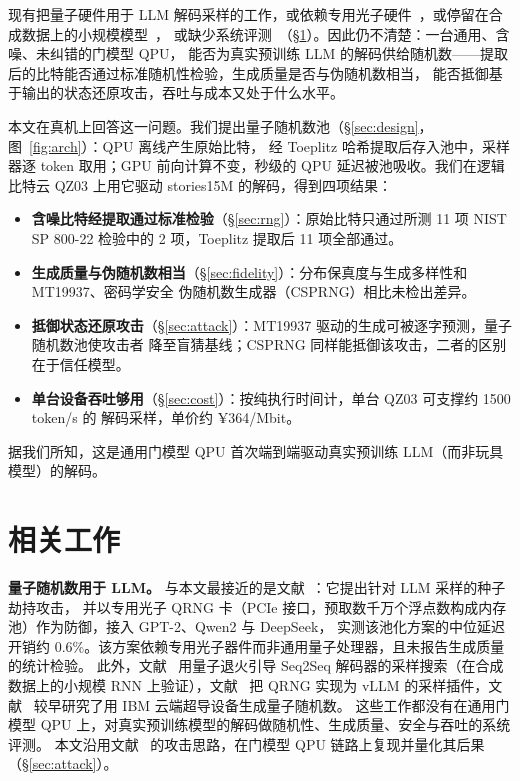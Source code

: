 \documentclass[11pt]{article}
\begin{document}
现有把量子硬件用于 LLM 解码采样的工作，或依赖专用光子硬件~\cite{seedhijack}，或停留在合成数据上的小规模模型~\cite{muroya2021}，%
或缺少系统评测~\cite{qrsampler}（\S\ref{sec:related}）。因此仍不清楚：一台通用、含噪、未纠错的门模型 QPU，%
能否为真实预训练 LLM 的解码供给随机数——提取后的比特能否通过标准随机性检验，生成质量是否与伪随机数相当，%
能否抵御基于输出的状态还原攻击，吞吐与成本又处于什么水平。

本文在真机上回答这一问题。我们提出量子随机数池（\S\ref{sec:design}，图~\ref{fig:arch}）：QPU 离线产生原始比特，%
经 Toeplitz 哈希提取后存入池中，采样器逐 token 取用；GPU 前向计算不变，秒级的 QPU 延迟被池吸收。我们在逻辑比特云
QZ03 上用它驱动 stories15M 的解码，得到四项结果：
\begin{itemize}
  \item \textbf{含噪比特经提取通过标准检验}（\S\ref{sec:rng}）：原始比特只通过所测 11 项 NIST SP 800-22 检验中的
        2 项，Toeplitz 提取后 11 项全部通过。
  \item \textbf{生成质量与伪随机数相当}（\S\ref{sec:fidelity}）：分布保真度与生成多样性和 MT19937、密码学安全%
        伪随机数生成器（CSPRNG）相比未检出差异。
  \item \textbf{抵御状态还原攻击}（\S\ref{sec:attack}）：MT19937 驱动的生成可被逐字预测，量子随机数池使攻击者%
        降至盲猜基线；CSPRNG 同样能抵御该攻击，二者的区别在于信任模型。
  \item \textbf{单台设备吞吐够用}（\S\ref{sec:cost}）：按纯执行时间计，单台 QZ03 可支撑约 1500 token/s 的%
        解码采样，单价约 ¥364/Mbit。
\end{itemize}
据我们所知，这是通用门模型 QPU 首次端到端驱动真实预训练 LLM（而非玩具模型）的解码。

\section{相关工作}
\label{sec:related}
\textbf{量子随机数用于 LLM。} 与本文最接近的是文献~\cite{seedhijack}：它提出针对 LLM 采样的种子劫持攻击，%
并以专用光子 QRNG 卡（PCIe 接口，预取数千万个浮点数构成内存池）作为防御，接入 GPT-2、Qwen2 与 DeepSeek，%
实测该池化方案的中位延迟开销约 0.6\%。该方案依赖专用光子器件而非通用量子处理器，且未报告生成质量的统计检验。%
此外，文献~\cite{muroya2021} 用量子退火引导 Seq2Seq 解码器的采样搜索（在合成数据上的小规模 RNN 上验证），文献~\cite{qrsampler}
把 QRNG 实现为 vLLM 的采样插件，文献~\cite{ibmqrng} 较早研究了用 IBM 云端超导设备生成量子随机数。%
这些工作都没有在通用门模型 QPU 上，对真实预训练模型的解码做随机性、生成质量、安全与吞吐的系统评测。%
本文沿用文献~\cite{seedhijack} 的攻击思路，在门模型 QPU 链路上复现并量化其后果（\S\ref{sec:attack}）。
\end{document}
